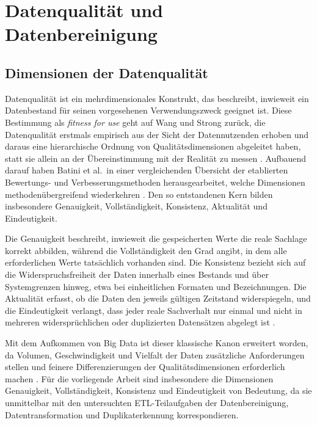 \section{Datenqualität und Datenbereinigung}
\label{sec:datenqualitaet}

\subsection{Dimensionen der Datenqualität}
\label{subsec:dq-dimensionen}

Datenqualität ist ein mehrdimensionales Konstrukt, das beschreibt, inwieweit ein Datenbestand für seinen vorgesehenen Verwendungszweck geeignet ist. Diese Bestimmung als \emph{fitness for use} geht auf Wang und Strong zurück, die Datenqualität erstmals empirisch aus der Sicht der Datennutzenden erhoben und daraus eine hierarchische Ordnung von Qualitätsdimensionen abgeleitet haben, statt sie allein an der Übereinstimmung mit der Realität zu messen \autocite{wangBeyondAccuracy1996}. Aufbauend darauf haben Batini et al.\ in einer vergleichenden Übersicht der etablierten Bewertungs- und Verbesserungsmethoden herausgearbeitet, welche Dimensionen methodenübergreifend wiederkehren \autocite{batiniMethodologiesDataQuality2009}. Den so entstandenen Kern bilden insbesondere Genauigkeit, Vollständigkeit, Konsistenz, Aktualität und Eindeutigkeit.

Die Genauigkeit beschreibt, inwieweit die gespeicherten Werte die reale Sachlage korrekt abbilden, während die Vollständigkeit den Grad angibt, in dem alle erforderlichen Werte tatsächlich vorhanden sind. Die Konsistenz bezieht sich auf die Widerspruchsfreiheit der Daten innerhalb eines Bestands und über Systemgrenzen hinweg, etwa bei einheitlichen Formaten und Bezeichnungen. Die Aktualität erfasst, ob die Daten den jeweils gültigen Zeitstand widerspiegeln, und die Eindeutigkeit verlangt, dass jeder reale Sachverhalt nur einmal und nicht in mehreren widersprüchlichen oder duplizierten Datensätzen abgelegt ist \autocite{batiniMethodologiesDataQuality2009,ridzuanReviewDataQuality2024}.

Mit dem Aufkommen von Big Data ist dieser klassische Kanon erweitert worden, da Volumen, Geschwindigkeit und Vielfalt der Daten zusätzliche Anforderungen stellen und feinere Differenzierungen der Qualitätsdimensionen erforderlich machen \autocite{ridzuanReviewDataQuality2024,rangineniReviewEnhancingData2023}. Für die vorliegende Arbeit sind insbesondere die Dimensionen Genauigkeit, Vollständigkeit, Konsistenz und Eindeutigkeit von Bedeutung, da sie unmittelbar mit den untersuchten \ac{ETL}-Teilaufgaben der Datenbereinigung, Datentransformation und Duplikaterkennung korrespondieren.

